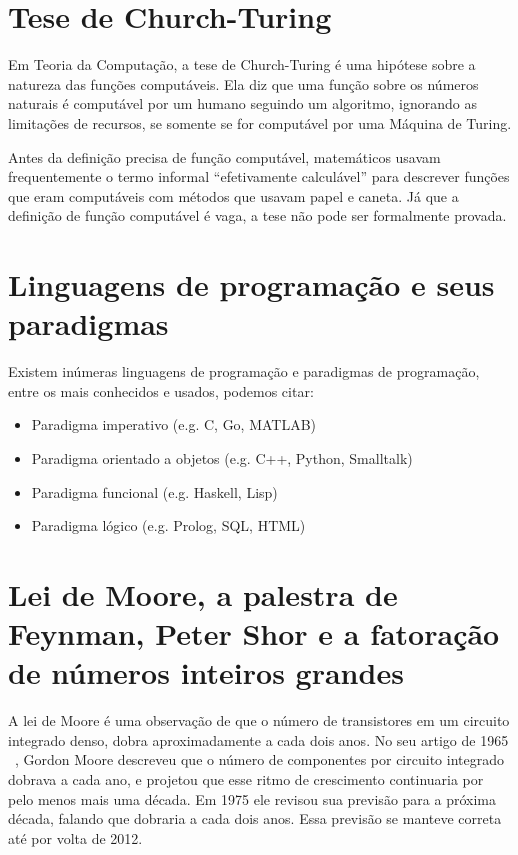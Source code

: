 \documentclass[a4paper,twocolumn,10pt]{article}
\begin{document}
\section{Tese de Church-Turing}

Em Teoria da Computação, a tese de Church-Turing é uma hipótese sobre a
natureza das funções computáveis. Ela diz que uma função sobre os números
naturais é computável por um humano seguindo um algoritmo, ignorando as
limitações de recursos, se somente se for computável por uma Máquina de Turing.

Antes da definição precisa de função computável, matemáticos usavam
frequentemente o termo informal ``efetivamente calculável'' para descrever
funções que eram computáveis com métodos que usavam papel e caneta. Já que a
definição de função computável é vaga, a tese não pode ser formalmente provada.

\section{Linguagens de programação e seus paradigmas}

Existem inúmeras linguagens de programação e paradigmas de programação, entre
os mais conhecidos e usados, podemos citar:

\begin{itemize}
	\item Paradigma imperativo (e.g. C, Go, MATLAB)
	\item Paradigma orientado a objetos (e.g. C++, Python, Smalltalk)
	\item Paradigma funcional (e.g. Haskell, Lisp)
	\item Paradigma lógico (e.g. Prolog, SQL, HTML)
\end{itemize}

\section{Lei de Moore, a palestra de Feynman, Peter Shor e a fatoração de
números inteiros grandes}

A lei de Moore é uma observação de que o número de transistores em um circuito
integrado denso, dobra aproximadamente a cada dois anos. No seu artigo de 1965
~\cite{Moore}, Gordon Moore descreveu que o número de componentes por circuito
integrado dobrava a cada ano, e projetou que esse ritmo de crescimento
continuaria por pelo menos mais uma década. Em 1975 ele revisou sua previsão
para a próxima década, falando que dobraria a cada dois anos. Essa previsão se
manteve correta até por volta de 2012.
\end{document}
